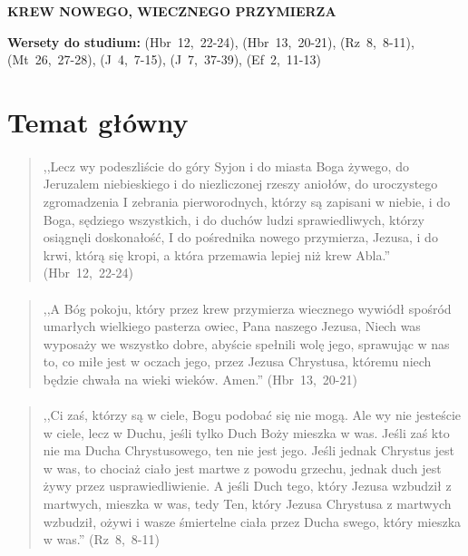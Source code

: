 \documentclass[10pt,a4paper,oneside]{article}
\begin{document}
\centerline{\textbf{\MakeUppercase{Krew nowego, wiecznego przymierza}}}
\begin{center}
\textbf{Wersety do studium:} \mbox{(Hbr 12, 22-24)}, \mbox{(Hbr 13, 20-21)}, \mbox{(Rz 8, 8-11)}, \mbox{(Mt 26, 27-28)}, \mbox{(J 4, 7-15)}, \mbox{(J 7, 37-39)}, \mbox{(Ef 2, 11-13)}
\end{center}
\section{Temat główny}
\paragraph{}
\begin{quote}
,,Lecz wy podeszliście do góry Syjon i do miasta Boga żywego, do Jeruzalem niebieskiego i do niezliczonej rzeszy aniołów, do uroczystego zgromadzenia I zebrania pierworodnych, którzy są zapisani w niebie, i do Boga, sędziego wszystkich, i do duchów ludzi sprawiedliwych, którzy osiągnęli doskonałość, I do pośrednika nowego przymierza, Jezusa, i do krwi, którą się kropi, a która przemawia lepiej niż krew Abla.'' \mbox{(Hbr 12, 22-24)}
\end{quote}
\paragraph{}
\begin{quote}
,,A Bóg pokoju, który przez krew przymierza wiecznego wywiódł spośród umarłych wielkiego pasterza owiec, Pana naszego Jezusa, Niech was wyposaży we wszystko dobre, abyście spełnili wolę jego, sprawując w nas to, co miłe jest w oczach jego, przez Jezusa Chrystusa, któremu niech będzie chwała na wieki wieków. Amen.'' \mbox{(Hbr 13, 20-21)}
\end{quote}
\paragraph{}
\begin{quote}
,,Ci zaś, którzy są w ciele, Bogu podobać się nie mogą. Ale wy nie jesteście w ciele, lecz w Duchu, jeśli tylko Duch Boży mieszka w was. Jeśli zaś kto nie ma Ducha Chrystusowego, ten nie jest jego. Jeśli jednak Chrystus jest w was, to chociaż ciało jest martwe z powodu grzechu, jednak duch jest żywy przez usprawiedliwienie. A jeśli Duch tego, który Jezusa wzbudził z martwych, mieszka w was, tedy Ten, który Jezusa Chrystusa z martwych wzbudził, ożywi i wasze śmiertelne ciała przez Ducha swego, który mieszka w was.'' \mbox{(Rz 8, 8-11)}
\end{quote}
\end{document}
